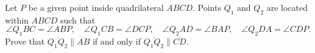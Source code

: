 Let $P$ be a given point inside quadrilateral $ABCD$.  Points $Q_1$ and $Q_2$ are located within $ABCD$ such that\[\angle Q_1BC=\angle ABP,\quad\angle Q_1CB=\angle DCP,\quad\angle Q_2AD=\angle BAP,\quad\angle Q_2DA=\angle CDP.\] Prove that $\overline{Q_1Q_2}\parallel\overline{AB}$ if and only if $\overline{Q_1Q_2}\parallel\overline{CD}$.